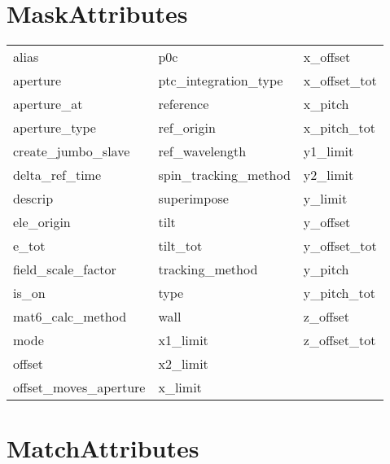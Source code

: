  \section{MaskAttributes}
 \label{s:list.mask}
 
 \begin{tabular}{lll} \toprule
alias                       & p0c                         & x_offset                    \\
aperture                    & ptc_integration_type        & x_offset_tot                \\
aperture_at                 & reference                   & x_pitch                     \\
aperture_type               & ref_origin                  & x_pitch_tot                 \\
create_jumbo_slave          & ref_wavelength              & y1_limit                    \\
delta_ref_time              & spin_tracking_method        & y2_limit                    \\
descrip                     & superimpose                 & y_limit                     \\
ele_origin                  & tilt                        & y_offset                    \\
e_tot                       & tilt_tot                    & y_offset_tot                \\
field_scale_factor          & tracking_method             & y_pitch                     \\
is_on                       & type                        & y_pitch_tot                 \\
mat6_calc_method            & wall                        & z_offset                    \\
mode                        & x1_limit                    & z_offset_tot                \\
offset                      & x2_limit                    &                             \\
offset_moves_aperture       & x_limit                     &                             \\
 \bottomrule
 \end{tabular}
 \vfill
 
 \section{MatchAttributes}
 \label{s:list.match}
 
